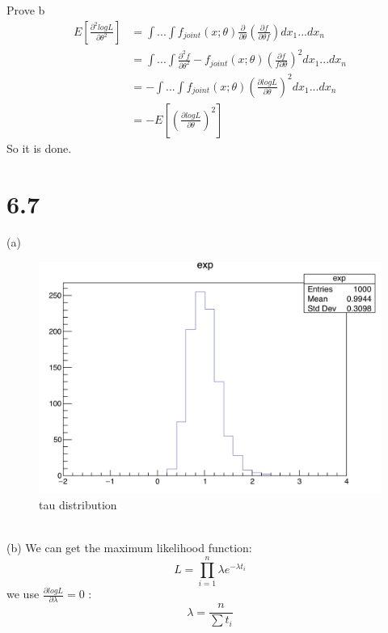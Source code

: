 \documentclass{article}
\begin{document}
\begin{CJK*}{GBK}{song}
\begin{equation}
 \end{equation}
 Prove b
   \begin{equation}
 \begin{aligned}
E[\frac{\partial^2logL}{\partial\theta^2}]&=\int...\int f_{joint}(x;\theta)\frac{\partial}{\partial \theta}(\frac{\partial f}{\partial \theta f})dx_1...dx_n\\
&=\int...\int\frac{\partial^2f}{\partial \theta^2}-f_{joint}(x;\theta)(\frac{\partial f}{f\partial\theta})^2dx_1...dx_n\\
 &=-\int...\int f_{joint}(x;\theta)(\frac{\partial logL}{\partial\theta})^2dx_1...dx_n\\
 &=-E[(\frac{\partial logL}{\partial \theta})^2]
 \end{aligned}
 \end{equation}
So it is done.
 \section{6.7}
 (a)
 \begin{figure}[ht]
\centering
\includegraphics[scale=0.5]{exp}
\caption{tau distribution}
\label{fig:label}
\end{figure}\\
 (b)
 We can get the maximum likelihood function:
 \begin{equation}
 L=\prod_{i=1}^n\lambda e^{-\lambda t_i}
 \end{equation}
 we use $ \frac{\partial logL}{\partial \lambda}=0$ : 
 \begin{equation}
 \lambda=\frac{n}{\sum t_i}
 \end{equation}
\begin{figure}[htb]
\centering
\subfloat[n=5]{%
}
\end{figure}
\end{CJK*}
\end{document}
